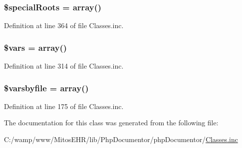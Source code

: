 \hypertarget{class_classes_ac4151ddad47b26840812370fe76efea3}{
\subsubsection[{\$special\-Roots}]{\setlength{\rightskip}{0pt plus 5cm}\$special\-Roots = array()}}\label{class_classes_ac4151ddad47b26840812370fe76efea3}


\-Definition at line 364 of file \-Classes.\-inc.

\hypertarget{class_classes_a09f2c833c130b4443725fb576d9d5269}{
\subsubsection[{\$vars}]{\setlength{\rightskip}{0pt plus 5cm}\$vars = array()}}\label{class_classes_a09f2c833c130b4443725fb576d9d5269}


\-Definition at line 314 of file \-Classes.\-inc.

\hypertarget{class_classes_a353de2400374e39aad749f19bc58e430}{
\subsubsection[{\$varsbyfile}]{\setlength{\rightskip}{0pt plus 5cm}\$varsbyfile = array()}}\label{class_classes_a353de2400374e39aad749f19bc58e430}


\-Definition at line 175 of file \-Classes.\-inc.



\-The documentation for this class was generated from the following file\-:\begin{DoxyCompactItemize}
\item 
\-C\-:/wamp/www/\-Mitos\-E\-H\-R/lib/\-Php\-Documentor/php\-Documentor/\hyperlink{_classes_8inc}{\-Classes.\-inc}\end{DoxyCompactItemize}
